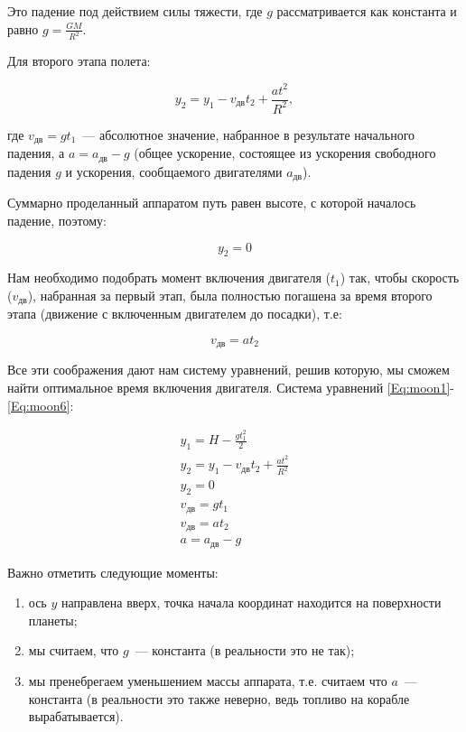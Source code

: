 \documentclass[12pt,a4paper]{article}
\begin{document}
Это падение под действием силы тяжести, где $g$ рассматривается как константа и равно $ g
= \frac{G M}{R^2}$.

Для второго этапа полета:

$$
y_2 = y_1 - v_{\text{дв}} t_2 + \frac{a t^2}{R^2},
$$

где $ v_{\text{дв}} = g t_1$~--- абсолютное значение, набранное в результате начального падения, а
$a = a_{\text{дв}} - g$ (общее ускорение, состоящее из ускорения свободного падения $g$ и
ускорения, сообщаемого двигателями $a_{\text{дв}}$).

Суммарно проделанный аппаратом путь равен высоте, с которой началось падение, поэтому:

$$
y_2 = 0
$$

Нам необходимо подобрать момент включения двигателя ($t_1$) так, чтобы скорость
($v_{\text{дв}}$), набранная за первый этап, была полностью погашена за время второго
этапа (движение с включенным двигателем до посадки), т.е:

$$
v_{\text{дв}} = a t_2
$$

Все эти соображения дают нам систему уравнений, решив которую, мы сможем найти оптимальное
время включения двигателя. Система уравнений \ref{Eq:moon1}-\ref{Eq:moon6}:

\begin{eqnarray}
  y_1 = H - \frac{g t^2_1}{2} \label{Eq:moon1} \\
  y_2 = y_1 - v_{\text{дв}} t_2 + \frac{a t^2}{R^2} \label{Eq:moon2}\\
  y_2 = 0 \label{Eq:moon3} \\
  v_{\text{дв}} = g t_1 \label{Eq:moon4} \\
  v_{\text{дв}} = a t_2 \label{Eq:moon5} \\
  a = a_{\text{дв}} - g \label{Eq:moon6}
\end{eqnarray}

Важно отметить следующие моменты:

\begin{enumerate}
\item ось $y$ направлена вверх, точка начала координат находится на поверхности планеты;
\item мы считаем, что $g$~--- константа (в реальности это не так);
\item мы пренебрегаем уменьшением массы аппарата, т.е. считаем что $a$~--- константа (в
  реальности это также неверно, ведь топливо на корабле вырабатывается).
\end{enumerate}  
\end{document}
